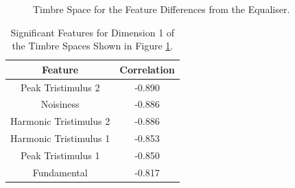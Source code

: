 	\begin{figure}[h!]
		\centering
		\qquad
		\caption{Timbre Space for the Feature Differences from the Equaliser.}
		\label{fig:EqualiserDifferenceMDSs}
	\end{figure}

	\begin{table}[h!]
		\centering
		\begin{tabular}{|c|c|}
			\hline
			\bf{Feature} & \bf{Correlation} \\
			\hline
			\hline
			Peak Tristimulus 2 & -0.890 \\
			\hline
			Noisiness & -0.886 \\
			\hline
			Harmonic Tristimulus 2 & -0.886 \\
			\hline
			Harmonic Tristimulus 1 & -0.853 \\
			\hline
			Peak Tristimulus 1 & -0.850 \\
			\hline
			Fundamental & -0.817 \\
			\hline
		\end{tabular}
		\caption{Significant Features for Dimension 1 of the Timbre Spaces Shown in Figure 
			 \ref{fig:EqualiserDifferenceMDSs}.}
		\label{tab:EqualiserDifferenceFeatures}
	\end{table}

